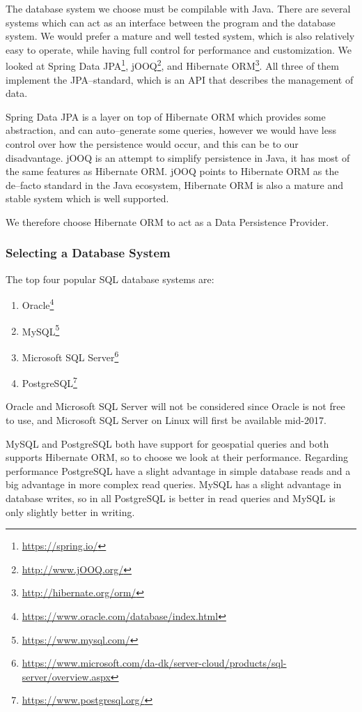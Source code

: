 The database system we choose must be compilable with Java.
There are several systems which can act as an interface between the program and the database system.
We would prefer a mature and well tested system, which is also relatively easy to operate, while having full control for performance and customization.
We looked at Spring Data JPA\footnote{\url{https://spring.io/}}, jOOQ\footnote{\url{http://www.jOOQ.org/}}, and Hibernate ORM\footnote{\url{http://hibernate.org/orm/}}.
All three of them implement the \ac{JPA}--standard\cite{JavaPersistenceAPI}, which is an \ac{API} that describes the management of data. 

Spring Data JPA is a layer on top of Hibernate ORM which provides some abstraction, and can auto--generate some queries, however we would have less control over how the persistence would occur, and this can be to our disadvantage.
jOOQ is an attempt to simplify persistence in Java, it has most of the same features as Hibernate ORM.
jOOQ points to Hibernate ORM as the de--facto standard in the Java ecosystem\cite{JOOQvsHIBERNATE},
Hibernate ORM is also a mature and stable system which is well supported. 

We therefore choose Hibernate ORM to act as a Data Persistence Provider. 

\subsubsection*{Selecting a Database System}

The top four popular SQL database systems are\cite{DB_RANKINGS}: 
\begin{enumerate}
\item Oracle\footnote{\url{https://www.oracle.com/database/index.html}}
\item MySQL\footnote{\url{https://www.mysql.com/}}
\item Microsoft SQL Server\footnote{\url{https://www.microsoft.com/da-dk/server-cloud/products/sql-server/overview.aspx}}
\item PostgreSQL\footnote{\url{https://www.postgresql.org/}}
\end{enumerate}

Oracle and Microsoft SQL Server will not be considered since Oracle is not free to use\cite{oracle_pricing}, 
and Microsoft SQL Server on Linux will first be available mid-2017\cite{ms_sql_linux}.

MySQL and PostgreSQL both have support for geospatial queries and both supports Hibernate ORM\cite{hibernate_support}, so to choose we look at their performance.
Regarding performance PostgreSQL have a slight advantage in simple database reads and a big advantage in more complex read queries.
MySQL has a slight advantage in database writes, 
so in all PostgreSQL is better in read queries and MySQL is only slightly better in writing.\cite{post_vs_mysql}

